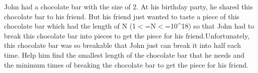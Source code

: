 John had a chocolate bar with the size of 2\textasciicircumi. At his birthday party, he shared this chocolate bar to his friend. But his friend just wanted to taste a piece of this chocolate bar which had the length of N (1$<$=N$<$=10\textasciicircum18) so that John had to break this chocolate bar into pieces to get the piece for his friend.Unfortunately, this chocolate bar was so breakable that John just can break it into half each time. 
Help him find the smallest length of the chocolate bar that he needs and the minimum times of breaking the chocolate bar to get the piece for his friend.